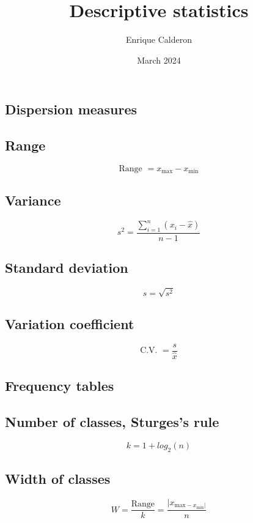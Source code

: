 \documentclass[letterpaper]{article}
\title{Descriptive statistics}
\author{Enrique Calderon}
\date{March 2024}
\newcommand{\divline}{\noindent\makebox[\linewidth]{\rule{\textwidth}{0.4pt}}}
\begin{document}
    \maketitle

    \divline
    \begin{multicols}{2}
        \section{Dispersion measures}

        \subsection{Range}
        
        \[\text{Range } = x_{\text{max}} - x_{\text{min}} \]

        \subsection{Variance}

        \[s^{2} = \frac{\sum_{i=1}^{n} (x_{i} - \hat{x})}{n-1} \]

        \subsection{Standard deviation}

        \[s = \sqrt{s^{2}}\]

        \subsection{Variation coefficient}

        \[\text{C.V. } = \frac{s}{\hat{x}}\]

    \end{multicols}

    \divline
    \begin{multicols}{2}
        \section{Frequency tables}

        \subsection{Number of classes, Sturges's rule}

        \[k = 1 + log_{2}(n)\]

        \subsection{Width of classes}

        \[W = \frac{\text{Range}}{k} = \frac{|x_{\text{max} - x_{\text{min}}|}}{n}\]
        
    \end{multicols}
\end{document}
